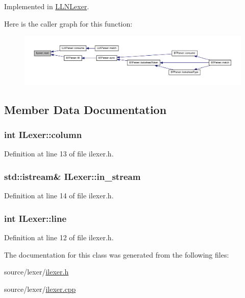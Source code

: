 Implemented in \hyperlink{class_l_l_n_lexer_a3832522afb32a85b3171f552ff9dd676}{LLNLexer}.



Here is the caller graph for this function:\nopagebreak
\begin{figure}[H]
\begin{center}
\leavevmode
\includegraphics[width=400pt]{class_i_lexer_a6f5098fda43f68b01d2e7a2a7158c50d_icgraph}
\end{center}
\end{figure}




\subsection{Member Data Documentation}
\hypertarget{class_i_lexer_a05ce2bfa3595f992618d2a328b66bdfb}{
\subsubsection[{column}]{\setlength{\rightskip}{0pt plus 5cm}int {\bf ILexer::column}}}
\label{class_i_lexer_a05ce2bfa3595f992618d2a328b66bdfb}


Definition at line 13 of file ilexer.h.

\hypertarget{class_i_lexer_a02d418cc6fdcbfbf6cad7bf914cce77f}{
\subsubsection[{in\_\-stream}]{\setlength{\rightskip}{0pt plus 5cm}std::istream\& {\bf ILexer::in\_\-stream}}}
\label{class_i_lexer_a02d418cc6fdcbfbf6cad7bf914cce77f}


Definition at line 14 of file ilexer.h.

\hypertarget{class_i_lexer_a5d766f4f4dcc976553ab17a5753ef8ff}{
\subsubsection[{line}]{\setlength{\rightskip}{0pt plus 5cm}int {\bf ILexer::line}}}
\label{class_i_lexer_a5d766f4f4dcc976553ab17a5753ef8ff}


Definition at line 12 of file ilexer.h.



The documentation for this class was generated from the following files:\begin{DoxyCompactItemize}
\item 
source/lexer/\hyperlink{ilexer_8h}{ilexer.h}\item 
source/lexer/\hyperlink{ilexer_8cpp}{ilexer.cpp}\end{DoxyCompactItemize}
